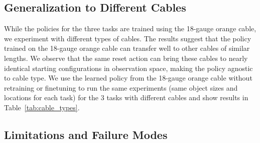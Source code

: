 \subsection{Generalization to Different Cables}
While the policies for the three tasks are trained using the 18-gauge orange cable, we experiment with different types of cables. The results suggest that the policy trained on the 18-gauge orange cable can transfer well to other cables of similar lengths. We observe that the same reset action can bring these cables to nearly identical starting configurations in observation space, making the policy agnostic to cable type. We use the learned policy from the 18-gauge orange cable without retraining or finetuning to run the same experiments (same object sizes and locations for each task) for the 3 tasks with different cables and show results in Table~\ref{tab:cable_types}. 

\vspace*{-8pt}
\subsection{Limitations and Failure Modes}

